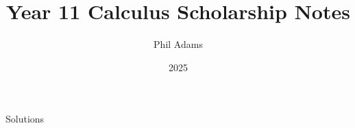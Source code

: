\documentclass[12pt, letterpaper]{article}
\title{Year 11 Calculus Scholarship Notes}
\author{Phil Adams}
\date{2025}
\begin{document}
\maketitle

\pagebreak

\tableofcontents
\setlength{\parskip}{10pt}
\pagebreak




\pagebreak
{}
\begin{center}
    \huge
    Solutions
    \normalsize
\end{center}
\restoregeometry

\pagebreak

\end{document}
